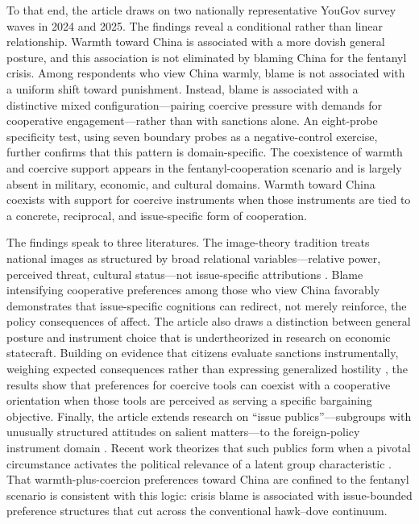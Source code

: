 \documentclass[12pt,letterpaper]{article}
\begin{document}
To that end, the article draws on two nationally representative YouGov survey waves in 2024 and 2025. The findings reveal a conditional rather than linear relationship. Warmth toward China is associated with a more dovish general posture, and this association is not eliminated by blaming China for the fentanyl crisis. Among respondents who view China warmly, blame is not associated with a uniform shift toward punishment. Instead, blame is associated with a distinctive mixed configuration---pairing coercive pressure with demands for cooperative engagement---rather than with sanctions alone. An eight-probe specificity test, using seven boundary probes as a negative-control exercise, further confirms that this pattern is domain-specific. The coexistence of warmth and coercive support appears in the fentanyl-cooperation scenario and is largely absent in military, economic, and cultural domains. Warmth toward China coexists with support for coercive instruments when those instruments are tied to a concrete, reciprocal, and issue-specific form of cooperation.

The findings speak to three literatures. The image-theory tradition treats national images as structured by broad relational variables---relative power, perceived threat, cultural status---not issue-specific attributions \citep{herrmann_images_1997}. Blame intensifying cooperative preferences among those who view China favorably demonstrates that issue-specific cognitions can redirect, not merely reinforce, the policy consequences of affect. The article also draws a distinction between general posture and instrument choice that is undertheorized in research on economic statecraft. Building on evidence that citizens evaluate sanctions instrumentally, weighing expected consequences rather than expressing generalized hostility \citep{jentleson_pretty_1992, heinrich_sanction_2017}, the results show that preferences for coercive tools can coexist with a cooperative orientation when those tools are perceived as serving a specific bargaining objective. Finally, the article extends research on ``issue publics''---subgroups with unusually structured attitudes on salient matters---to the foreign-policy instrument domain \citep{krosnick_government_1990, krosnick_public_1995}. Recent work theorizes that such publics form when a pivotal circumstance activates the political relevance of a latent group characteristic \citep{rossiter_development_2026}. That warmth-plus-coercion preferences toward China are confined to the fentanyl scenario is consistent with this logic: crisis blame is associated with issue-bounded preference structures that cut across the conventional hawk--dove continuum.
\end{document}
